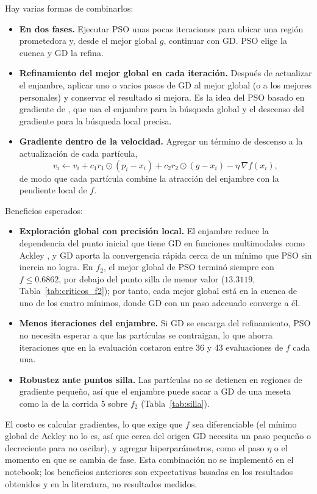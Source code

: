 Hay varias formas de combinarlos:
\begin{itemize}
    \item \textbf{En dos fases.} Ejecutar PSO unas pocas iteraciones para
    ubicar una región prometedora y, desde el mejor global $g$, continuar con
    GD. PSO elige la cuenca y GD la refina.
    \item \textbf{Refinamiento del mejor global en cada iteración.} Después
    de actualizar el enjambre, aplicar uno o varios pasos de GD al mejor
    global (o a los mejores personales) y conservar el resultado si mejora.
    Es la idea del PSO basado en gradiente de \cite{noel2012gradient}, que
    usa el enjambre para la búsqueda global y el descenso del gradiente para
    la búsqueda local precisa.
    \item \textbf{Gradiente dentro de la velocidad.} Agregar un término de
    descenso a la actualización de cada partícula,
    \[
    v_i \leftarrow v_i + c_1 r_1\odot(p_i-x_i) + c_2 r_2\odot(g-x_i)
    - \eta\,\nabla f(x_i),
    \]
    de modo que cada partícula combine la atracción del enjambre con la
    pendiente local de $f$.
\end{itemize}

Beneficios esperados:
\begin{itemize}
    \item \textbf{Exploración global con precisión local.} El enjambre
    reduce la dependencia del punto inicial que tiene GD en funciones
    multimodales como Ackley \cite{kennedy1995particle}, y GD aporta la
    convergencia rápida cerca de un mínimo \cite{nocedal2006numerical} que
    PSO sin inercia no logra. En $f_2$, el mejor global de PSO terminó
    siempre con $f\leq0.6862$, por debajo del punto silla de menor valor
    ($13.3119$, Tabla~\ref{tab:criticos_f2}); por tanto, cada mejor global
    está en la cuenca de uno de los cuatro mínimos, donde GD con un paso
    adecuado converge a él.
    \item \textbf{Menos iteraciones del enjambre.} Si GD se encarga del
    refinamiento, PSO no necesita esperar a que las partículas se contraigan,
    lo que ahorra iteraciones que en la evaluación costaron entre 36 y 43
    evaluaciones de $f$ cada una.
    \item \textbf{Robustez ante puntos silla.} Las partículas no se detienen
    en regiones de gradiente pequeño, así que el enjambre puede sacar a GD
    de una meseta como la de la corrida 5 sobre $f_2$
    (Tabla~\ref{tab:silla}).
\end{itemize}
El costo es calcular gradientes, lo que exige que $f$ sea diferenciable (el
mínimo global de Ackley no lo es, así que cerca del origen GD necesita un
paso pequeño o decreciente para no oscilar), y agregar hiperparámetros, como
el paso $\eta$ o el momento en que se cambia de fase. Esta combinación no se
implementó en el notebook; los beneficios anteriores son expectativas
basadas en los resultados obtenidos y en la literatura, no resultados
medidos.
